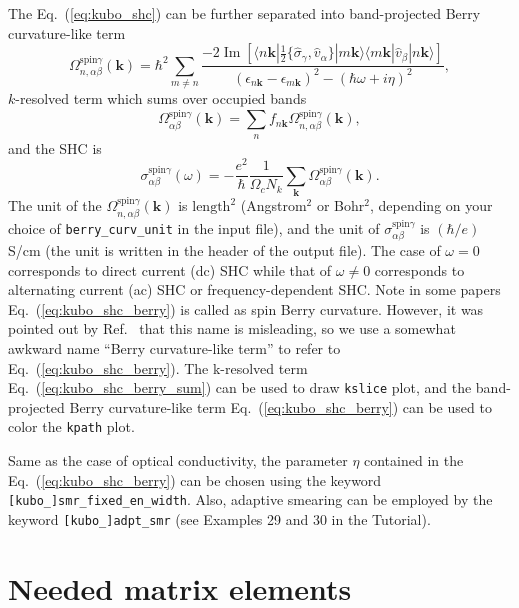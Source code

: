 The Eq.~(\ref{eq:kubo_shc}) can be further separated into 
band-projected Berry curvature-like term
\begin{equation}
\label{eq:kubo_shc_berry}
\Omega_{n,\alpha\beta}^{\text{spin}\gamma}(\bm{k}) = {\hbar}^2 \sum_{
	m\ne n}\frac{-2\operatorname{Im}[\langle n\bm{k}| 
	\frac{1}{2}\{\hat{\sigma}_{\gamma},\hat{v}_{\alpha}\}|m\bm{k}\rangle
	\langle m\bm{k}| \hat{v}_{\beta}|n\bm{k}\rangle]}
{(\epsilon_{n\bm{k}}-\epsilon_{m\bm{k}})^2-(\hbar\omega+i\eta)^2},
\end{equation}
$k$-resolved term which sums over occupied bands
\begin{equation}
\label{eq:kubo_shc_berry_sum}
\Omega_{\alpha\beta}^{\text{spin}\gamma}(\bm{k}) = \sum_{n}
f_{n\bm{k}} \Omega_{n,\alpha\beta}^{\text{spin}\gamma}(\bm{k}),
\end{equation}
and the SHC is 
\begin{equation}
\sigma_{\alpha\beta}^{\text{spin}\gamma}(\omega) = 
-\frac{e^2}{\hbar}\frac{1}{\Omega_c N_k}\sum_{\bm{k}}
\Omega_{\alpha\beta}^{\text{spin}\gamma}(\bm{k}).
\end{equation}
The unit of the $\Omega_{n,\alpha\beta}^{\text{spin}\gamma}(\bm{k})$ 
is $\text{length}^{2}$ (Angstrom$^2$ or Bohr$^2$, depending on your 
choice of {\tt berry\_curv\_unit} in the input file), 
and the unit of  $\sigma_{\alpha\beta}^{\text{spin}\gamma}$ 
is $(\hbar/e)$S/cm (the unit is written in the header of the output file). 
The case of $\omega=0$ corresponds to 
direct current (dc) SHC while that of $\omega\ne0$ 
corresponds to alternating current (ac) SHC or frequency-dependent SHC. 
Note in some papers Eq.~(\ref{eq:kubo_shc_berry}) is called as 
spin Berry curvature. However, it was pointed out by 
Ref.~\cite{Gradhand_2012} that this 
name is misleading, so we use a somewhat awkward name 
``Berry curvature-like term'' to refer to Eq.~(\ref{eq:kubo_shc_berry}). 
The k-resolved term Eq.~(\ref{eq:kubo_shc_berry_sum}) can be 
used to draw {\tt kslice} plot, and the band-projected Berry curvature-like term 
Eq.~(\ref{eq:kubo_shc_berry})
can be used to color the {\tt kpath} plot. 

Same as the case of optical conductivity, the parameter
$\eta$ contained in the Eq.~(\ref{eq:kubo_shc_berry}) can be chosen using the keyword {\tt[kubo\_]smr\_fixed\_en\_width}. Also, adaptive smearing can 
be employed by the keyword {\tt [kubo\_]adpt\_smr} 
(see Examples 29 and 30 in the Tutorial). 


\section{Needed matrix elements}

